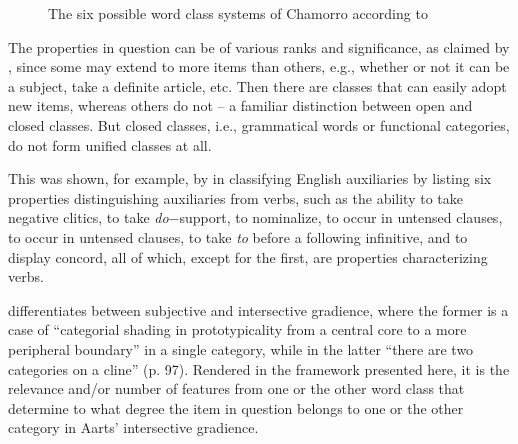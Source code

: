 \documentclass[output=paper]{langsci/langscibook}
\begin{document}
\begin{figure}
\caption{The six possible word class systems of Chamorro according to
\textcite{Haspelmath2012}}\label{tab:27.2}
\end{figure}

The properties in question can be of various ranks and significance, as claimed
by \citet{Crystal1967}, since some may extend to more items than others, e.g.,
whether or not it can be a subject, take a definite article, etc. Then there
are classes that can easily adopt new items, whereas others do not – a familiar
distinction between open and closed classes. But closed classes, i.e.,
grammatical words or functional categories, do not form unified classes at all.

This was shown, for example, by \citet{Radford1976} in classifying English
auxiliaries by listing six properties distinguishing auxiliaries from verbs,
such as the ability to take negative clitics, to take \emph{do}−support, to
nominalize, to occur in untensed clauses, to occur in untensed clauses, to take
\emph{to} before a following infinitive, and to display concord, all of which,
except for the first, are properties characterizing verbs.

\citet{Aarts2007} differentiates between subjective and intersective gradience,
where the former is a case of “categorial shading in prototypicality from a
central core to a more peripheral boundary” in a single category, while in the
latter “there are two categories on a cline” (p. 97). Rendered in the framework
presented here, it is the relevance and/or number of features from one or the
other word class that determine to what degree the item in question belongs
to one or the other category in Aarts’ intersective gradience.
\end{document}
